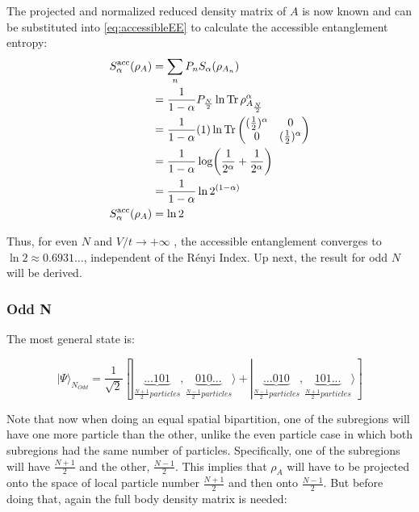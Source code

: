\begin{samepage}
The projected and normalized reduced density matrix of $A$ is now known and can be substituted into \ref{eq:accessibleEE} to calculate the accessible entanglement entropy:
\begin {align} 
S_{\alpha}^{\mathrm{acc}}(\rho_A) &= \sum_{n} P_n S_{\alpha}(\rho_{A_n}) \nonumber \\
&=  \frac{1}{1-\alpha} P_{\frac{N}{2}} \ln{\operatorname{Tr}{\rho_{A_{\frac{N}{2}}}^{\alpha}}} \nonumber \\
&= \frac{1}{1-\alpha} (1) \ln{\operatorname{Tr}{\begin{pmatrix}  (\frac{1}{2})^{\alpha} & 0 \\ 0 & (\frac{1}{2})^{\alpha}   \end{pmatrix}}} \nonumber \\
&= \frac{1}{1-\alpha} \log({\frac{1}{2^{\alpha}} + \frac{1}{2^{\alpha}}}) \nonumber \\
&= \frac{1}{1-\alpha} \ln{2^{(1-\alpha)}} \nonumber \\
S_{\alpha}^{\mathrm{acc}}(\rho_A) &= \ln{2}
\end {align}

Thus, for even $N$ and $V/t \to + \infty$ , the accessible entanglement converges to $\ln{2} \approx 0.6931\dots$, independent of the R\'enyi Index. Up next, the result for odd $N$ will be derived.

	\subsubsection{Odd N}
	
	The most general state is:
	
	\begin{equation}
	| \Psi \rangle_{N_{Odd}} = \frac{1}{\sqrt{2}} [|\underbrace{...101}_{\frac{N+1}{2} particles}, \underbrace{010...}_{\frac{N-1}{2} particles} \rangle + |\underbrace{...010}_{\frac{N-1}{2} particles}, \underbrace{101...}_{\frac{N+1}{2} particles} \rangle ]
	\end{equation}
	
	Note that now when doing an equal spatial bipartition, one of the subregions will have one more particle than the other, unlike the even particle case in which both subregions had the same number of particles. Specifically, one of the subregions will have $\frac{N+1}{2}$ and the other, $\frac{N-1}{2}$. This implies that $\rho_{A}$ will have to be projected onto the space of local particle number $\frac{N+1}{2}$ and then onto $\frac{N-1}{2}$. But before doing that, again the full body density matrix is needed:
	

\end{samepage}
